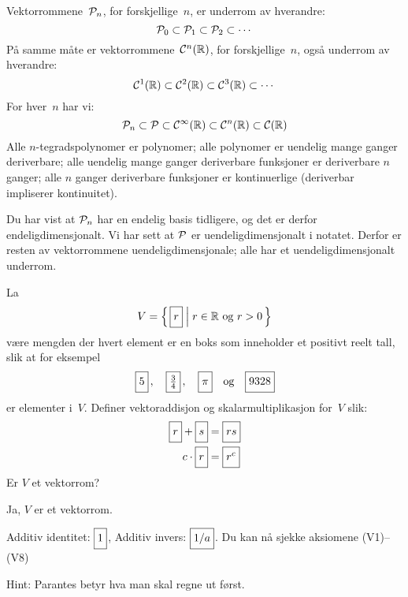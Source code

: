 \begin{losning}

\begin{punkt}
Vektorrommene~$\P_n$, for forskjellige~$n$, er underrom av hverandre:
\[
\P_0 \subset \P_1 \subset \P_2 \subset \cdots
\]
På samme måte er vektorrommene~$\C^n(\R)$, for forskjellige~$n$, også
underrom av hverandre:
\[
\C^1(\R) \subset \C^2(\R) \subset \C^3(\R) \subset \cdots
\]
For hver~$n$ har vi:
\[
\P_n \subset \P \subset \C^\infty(\R) \subset \C^n(\R) \subset \C(\R)
\]
Alle $n$-tegradspolynomer er polynomer;
alle polynomer er uendelig mange ganger deriverbare;
alle uendelig mange ganger deriverbare funksjoner er deriverbare $n$ ganger;
alle $n$ ganger deriverbare funksjoner er kontinuerlige (deriverbar impliserer kontinuitet).
\end{punkt}

\begin{punkt}
Du har vist at $\P_n$ har en endelig basis tidligere, og det er derfor endeligdimensjonalt.
Vi har sett at $\P$ er uendeligdimensjonalt i notatet.
Derfor er resten av vektorrommene uendeligdimensjonale; alle har et uendeligdimensjonalt underrom. 
\end{punkt}


\end{losning}



\begin{oppgave}
La
\[
V = \left\{\, \boks{r} \;\middle|\; \text{$r \in \R$ og $r > 0$} \,\right\}
\]
være mengden der hvert element er en boks som inneholder et positivt reelt tall,
slik at for eksempel
\[
\boks{5}\,,\quad
\boks{\frac{3}{4}}\,,\quad
\boks{\pi}\quad\text{og}\quad
\boks{9328}
\]
er elementer i~$V$.  Definer vektoraddisjon og skalarmultiplikasjon
for~$V$ slik:
\begin{align*}
\boks{r} + \boks{s} &= \boks{rs} \\
c \cdot \boks{r}    &= \boks{r^c}
\end{align*}
Er $V$ et vektorrom?
\end{oppgave}

\begin{losning}
Ja, $V$ er et vektorrom.

Additiv identitet: $\boks{1}$, Additiv invers: $\boks{1/a}$. Du kan nå sjekke aksiomene (V1)--(V8)

Hint: Parantes betyr hva man skal regne ut først.
\end{losning}

